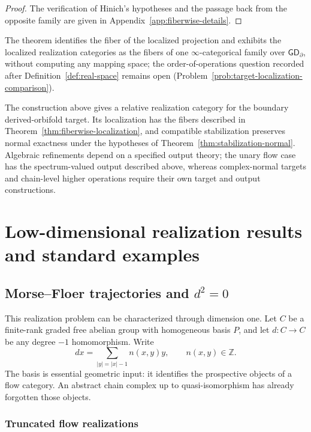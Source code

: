 \documentclass[11pt,letterpaper,twoside]{article}
\theoremstyle{plain}
\theoremstyle{definition}
\theoremstyle{remark}
\newcommand{\BGrm}{\mathsf{GD}_{\partial}}
\begin{document}
\begin{proof}
The verification of Hinich's hypotheses and the passage back from the opposite family are given in Appendix~\ref{app:fiberwise-details}.
\end{proof}

The theorem identifies the fiber of the localized projection and exhibits the localized realization categories as the fibers of one \(\infty\)-categorical family over \(\BGrm\), without computing any mapping space; the order-of-operations question recorded after Definition~\ref{def:real-space} remains open (Problem~\ref{prob:target-localization-comparison}).

The construction above gives a relative realization category for the boundary derived-orbifold target.  Its localization has the fibers described in Theorem~\ref{thm:fiberwise-localization}, and compatible stabilization preserves normal exactness under the hypotheses of Theorem~\ref{thm:stabilization-normal}.  Algebraic refinements depend on a specified output theory; the unary flow case has the spectrum-valued output described above, whereas complex-normal targets and chain-level higher operations require their own target and output constructions.

\section{Low-dimensional realization results and standard examples}\label{sec:examples}

\subsection{Morse--Floer trajectories and \texorpdfstring{\(d^2=0\)}{d squared = 0}}
\label{sec:flow-d2}

This realization problem can be characterized through dimension one.  Let \(C\) be a finite-rank graded free abelian group with homogeneous basis \(P\), and let \(d:C\to C\) be any degree \(-1\) homomorphism.  Write
\begin{equation}\label{eq:based-differential}
 dx=\sum_{|y|=|x|-1}n(x,y)y,
 \qquad n(x,y)\in\mathbb Z.
\end{equation}
The basis is essential geometric input: it identifies the prospective objects of a flow category.  An abstract chain complex up to quasi-isomorphism has already forgotten those objects.

\subsubsection{Truncated flow realizations}
\end{document}
